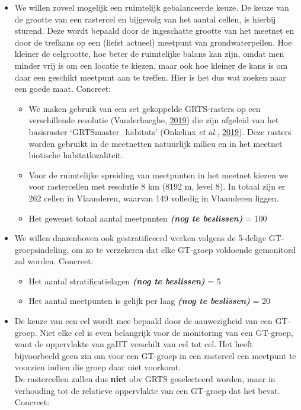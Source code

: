 \documentclass[11pt,]{book}
\providecommand{\tightlist}{%
  \setlength{\itemsep}{0pt}\setlength{\parskip}{0pt}}
\begin{document}
\begin{itemize}
\tightlist
\item
  We willen zoveel mogelijk een ruimtelijk gebalanceerde keuze. De keuze
  van de grootte van een rastercel en bijgevolg van het aantal cellen,
  is hierbij sturend. Deze wordt bepaald door de ingeschatte grootte van
  het meetnet en door de trefkans op een (liefst actueel) meetpunt van
  grondwaterpeilen. Hoe kleiner de celgrootte, hoe beter de ruimtelijke
  balans kan zijn, omdat men minder vrij is om een locatie te kiezen,
  maar ook hoe kleiner de kans is om daar een geschikt meetpunt aan te
  treffen. Hier is het dus wat zoeken naar een goede maat. Concreet:

  \begin{itemize}
  \tightlist
  \item
    We maken gebruik van een set gekoppelde GRTS-rasters op een
    verschillende resolutie (Vanderhaeghe,
    \protect\hyperlink{ref-vanderhaeghe_grtsmh_diffres_2019}{2019}) die
    zijn afgeleid van het basisraster `GRTSmaster\_habitats' (Onkelinx
    \emph{et al.}, \protect\hyperlink{ref-onkelinx_grts_2019}{2019}).
    Deze rasters worden gebruikt in de meetnetten natuurlijk milieu en
    in het meetnet biotische habitatkwaliteit.
  \item
    Voor de ruimtelijke spreiding van meetpunten in het meetnet kiezen
    we voor rastercellen met resolutie 8 km (8192 m, level 8). In totaal
    zijn er 262 cellen in Vlaanderen, waarvan 149 volledig in Vlaanderen
    liggen.
  \item
    Het gewenst totaal aantal meetpunten \textbf{\emph{(nog te
    beslissen)}} = 100
  \end{itemize}
\item
  We willen daarenboven ook gestratificeerd werken volgens de 5-delige
  GT-groepsindeling, om zo te verzekeren dat elke GT-groep voldoende
  gemonitord zal worden. Concreet:

  \begin{itemize}
  \tightlist
  \item
    Het aantal stratificatielagen \textbf{\emph{(nog te beslissen)}} = 5
  \item
    Het aantal meetpunten is gelijk per laag \textbf{\emph{(nog te
    beslissen)}} = 20
  \end{itemize}
\item
  De keuze van een cel wordt mee bepaald door de aanwezigheid van een
  GT-groep. Niet elke cel is even belangrijk voor de monitoring van een
  GT-groep, want de oppervlakte van gaHT verschilt van cel tot cel. Het
  heeft bijvoorbeeld geen zin om voor een GT-groep in een rastercel een
  meetpunt te voorzien indien die groep daar niet voorkomt.\\
  De rastercellen zullen dus \textbf{niet} obv GRTS geselecteerd worden,
  maar in verhouding tot de relatieve oppervlakte van een GT-groep dat
  het bevat. Concreet:


\end{itemize}
\end{document}
